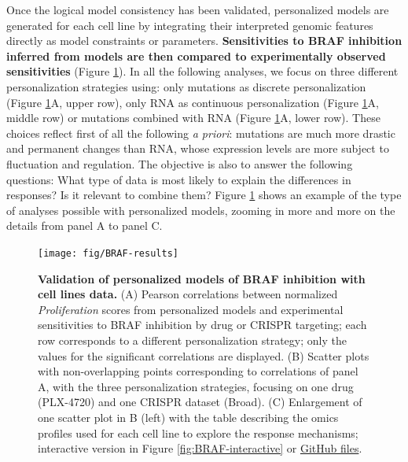 \documentclass[a4paper,12pt,twoside,onecolumn,openright,final,oldfontcommands]{memoir}
\begin{document}
Once the logical model consistency has been validated, personalized
models are generated for each cell line by integrating their interpreted
genomic features directly as model constraints or parameters.
\textbf{Sensitivities to BRAF inhibition inferred from models are then
compared to experimentally observed sensitivities} (Figure
\ref{fig:BRAF-results}). In all the following analyses, we focus on
three different personalization strategies using: only mutations as
discrete personalization (Figure \ref{fig:BRAF-results}A, upper row),
only RNA as continuous personalization (Figure \ref{fig:BRAF-results}A,
middle row) or mutations combined with RNA (Figure
\ref{fig:BRAF-results}A, lower row). These choices reflect first of all
the following \emph{a priori}: mutations are much more drastic and
permanent changes than RNA, whose expression levels are more subject to
fluctuation and regulation. The objective is also to answer the
following questions: What type of data is most likely to explain the
differences in responses? Is it relevant to combine them? Figure
\ref{fig:BRAF-results} shows an example of the type of analyses possible
with personalized models, zooming in more and more on the details from
panel A to panel C.

\begin{figure}

{\centering \texttt{[image: fig/BRAF-results]} 

}

\caption[Validation of personalized models of BRAF inhibition with cell lines data]{\textbf{Validation of personalized models of
BRAF inhibition with cell lines data.} (A) Pearson correlations between
normalized \emph{Proliferation} scores from personalized models and
experimental sensitivities to BRAF inhibition by drug or CRISPR
targeting; each row corresponds to a different personalization strategy;
only the values for the significant correlations are displayed. (B)
Scatter plots with non-overlapping points corresponding to correlations
of panel A, with the three personalization strategies, focusing on one
drug (PLX-4720) and one CRISPR dataset (Broad). (C) Enlargement of one
scatter plot in B (left) with the table describing the omics profiles
used for each cell line to explore the response mechanisms; interactive
version in Figure \ref{fig:BRAF-interactive} or
\href{https://github.com/sysbio-curie/PROFILE_BRAF_Model/blob/master/Analysis.html}{GitHub
files}.}\label{fig:BRAF-results}
\end{figure}
\end{document}
